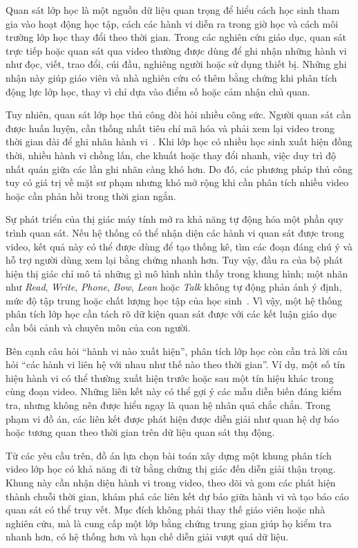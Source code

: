 Quan sát lớp học là một nguồn dữ liệu quan trọng để hiểu cách học sinh tham gia vào hoạt động học tập, cách các hành vi diễn ra trong giờ học và cách môi trường lớp học thay đổi theo thời gian. Trong các nghiên cứu giáo dục, quan sát trực tiếp hoặc quan sát qua video thường được dùng để ghi nhận những hành vi như đọc, viết, trao đổi, cúi đầu, nghiêng người hoặc sử dụng thiết bị. Những ghi nhận này giúp giáo viên và nhà nghiên cứu có thêm bằng chứng khi phân tích động lực lớp học, thay vì chỉ dựa vào điểm số hoặc cảm nhận chủ quan.

Tuy nhiên, quan sát lớp học thủ công đòi hỏi nhiều công sức. Người quan sát cần được huấn luyện, cần thống nhất tiêu chí mã hóa và phải xem lại video trong thời gian dài để ghi nhãn hành vi \,\cite{pianta2009observation,volpe2025classroom}. Khi lớp học có nhiều học sinh xuất hiện đồng thời, nhiều hành vi chồng lấn, che khuất hoặc thay đổi nhanh, việc duy trì độ nhất quán giữa các lần ghi nhãn càng khó hơn. Do đó, các phương pháp thủ công tuy có giá trị về mặt sư phạm nhưng khó mở rộng khi cần phân tích nhiều video hoặc cần phản hồi trong thời gian ngắn.

Sự phát triển của thị giác máy tính mở ra khả năng tự động hóa một phần quy trình quan sát. Nếu hệ thống có thể nhận diện các hành vi quan sát được trong video, kết quả này có thể được dùng để tạo thống kê, tìm các đoạn đáng chú ý và hỗ trợ người dùng xem lại bằng chứng nhanh hơn. Tuy vậy, đầu ra của bộ phát hiện thị giác chỉ mô tả những gì mô hình nhìn thấy trong khung hình; một nhãn như \textit{Read}, \textit{Write}, \textit{Phone}, \textit{Bow}, \textit{Lean} hoặc \textit{Talk} không tự động phản ánh ý định, mức độ tập trung hoặc chất lượng học tập của học sinh \,\cite{fredricks2004engagement}. Vì vậy, một hệ thống phân tích lớp học cần tách rõ dữ kiện quan sát được với các kết luận giáo dục cần bối cảnh và chuyên môn của con người.

Bên cạnh câu hỏi ``hành vi nào xuất hiện'', phân tích lớp học còn cần trả lời câu hỏi ``các hành vi liên hệ với nhau như thế nào theo thời gian''. Ví dụ, một số tín hiệu hành vi có thể thường xuất hiện trước hoặc sau một tín hiệu khác trong cùng đoạn video. Những liên kết này có thể gợi ý các mẫu diễn biến đáng kiểm tra, nhưng không nên được hiểu ngay là quan hệ nhân quả chắc chắn. Trong phạm vi đồ án, các liên kết được phát hiện được diễn giải như quan hệ dự báo hoặc tương quan theo thời gian trên dữ liệu quan sát thụ động.

Từ các yêu cầu trên, đồ án lựa chọn bài toán xây dựng một khung phân tích video lớp học có khả năng đi từ bằng chứng thị giác đến diễn giải thận trọng. Khung này cần nhận diện hành vi trong video, theo dõi và gom các phát hiện thành chuỗi thời gian, khám phá các liên kết dự báo giữa hành vi và tạo báo cáo quan sát có thể truy vết. Mục đích không phải thay thế giáo viên hoặc nhà nghiên cứu, mà là cung cấp một lớp bằng chứng trung gian giúp họ kiểm tra nhanh hơn, có hệ thống hơn và hạn chế diễn giải vượt quá dữ liệu.

